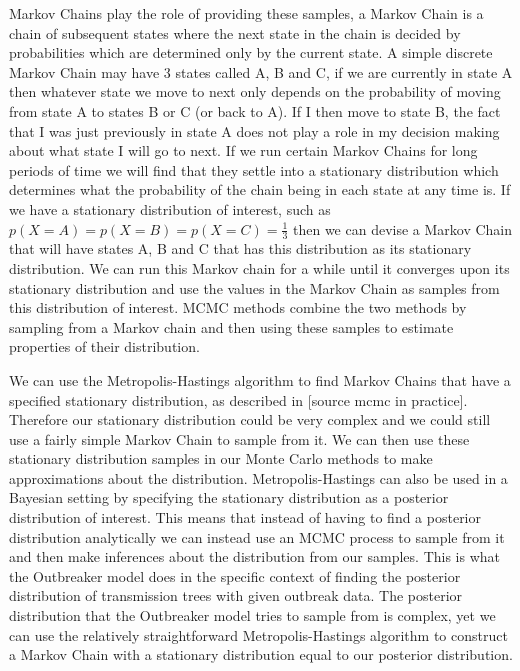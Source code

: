 \documentclass[11pt,a4paper]{report}
\begin{document}
Markov Chains play the role of providing these samples, a Markov Chain is a chain of subsequent states where the next state in the chain is decided by probabilities which are determined only by the current state. A simple discrete Markov Chain may have 3 states called A, B and C, if we are currently in state A then whatever state we move to next only depends on the probability of moving from state A to states B or C (or back to A). If I then move to state B, the fact that I was just previously in state A does not play a role in my decision making about what state I will go to next. If we run certain Markov Chains for long periods of time we will find that they settle into a stationary distribution which determines what the probability of the chain being in each state at any time is. If we have a stationary distribution of interest, such as $p(X=A)=p(X=B)=p(X=C)=\frac{1}{3}$ then we can devise a Markov Chain that will have states A, B and C that has this distribution as its stationary distribution. We can run this Markov chain for a while until it converges upon its stationary distribution and use the values in the Markov Chain as samples from this distribution of interest. MCMC methods combine the two methods by sampling from a Markov chain and then using these samples to estimate properties of their distribution.

We can use the Metropolis-Hastings algorithm to find Markov Chains that have a specified stationary distribution, as described in [source mcmc in practice]. Therefore our stationary distribution could be very complex and we could still use a fairly simple Markov Chain to sample from it. We can then use these stationary distribution samples in our Monte Carlo methods to make approximations about the distribution. Metropolis-Hastings can also be used in a Bayesian setting by specifying the stationary distribution as a posterior distribution of interest. This means that instead of having to find a posterior distribution analytically we can instead use an MCMC process to sample from it and then make inferences about the distribution from our samples. This is what the Outbreaker model does in the specific context of finding the posterior distribution of transmission trees with given outbreak data. The posterior distribution that the Outbreaker model tries to sample from is complex, yet we can use the relatively straightforward Metropolis-Hastings algorithm to construct a Markov Chain with a stationary distribution equal to our posterior distribution.
\end{document}
